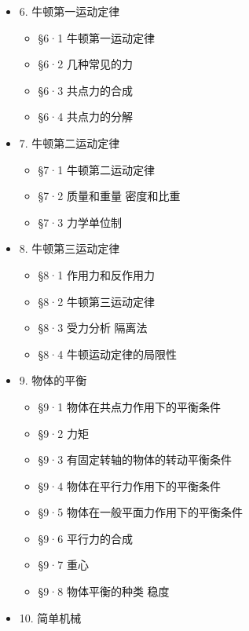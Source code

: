 \begin{itemize}
  \begin{itemize}
  \tightlist
  \item
    §5·1 变速直线运动 平均速度 即时速度
  \item
    §5·2 匀变速直线运动 加速度
  \item
    §5·3 匀加速直线运动的速度和路程
  \item
    §5·4 匀减速直线运动的速度和路程
  \item
    §5·5 匀加速直线运动的速度图线
  \item
    §5·6 匀减速直线运动的速度图线
  \item
    §5·7 自由落体运动
  \item
    §5·8 竖直上抛运动
  \end{itemize}
\item
  6. 牛顿第一运动定律

  \begin{itemize}
  \tightlist
  \item
    §6·1 牛顿第一运动定律
  \item
    §6·2 几种常见的力
  \item
    §6·3 共点力的合成
  \item
    §6·4 共点力的分解
  \end{itemize}
\item
  7. 牛顿第二运动定律

  \begin{itemize}
  \tightlist
  \item
    §7·1 牛顿第二运动定律
  \item
    §7·2 质量和重量 密度和比重
  \item
    §7·3 力学单位制
  \end{itemize}
\item
  8. 牛顿第三运动定律

  \begin{itemize}
  \tightlist
  \item
    §8·1 作用力和反作用力
  \item
    §8·2 牛顿第三运动定律
  \item
    §8·3 受力分析 隔离法
  \item
    §8·4 牛顿运动定律的局限性
  \end{itemize}
\item
  9. 物体的平衡

  \begin{itemize}
  \tightlist
  \item
    §9·1 物体在共点力作用下的平衡条件
  \item
    §9·2 力矩
  \item
    §9·3 有固定转轴的物体的转动平衡条件
  \item
    §9·4 物体在平行力作用下的平衡条件
  \item
    §9·5 物体在一般平面力作用下的平衡条件
  \item
    §9·6 平行力的合成
  \item
    §9·7 重心
  \item
    §9·8 物体平衡的种类 稳度
  \end{itemize}
\item
  10. 简单机械


\end{itemize}
